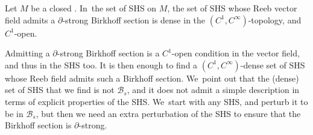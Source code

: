 \begin{theorem}\label{thm:C1generic}
Let $M$ be a closed \threemanifold. In~the set of SHS on $M$, the set of SHS whose Reeb vector field admits a $\partial$-strong Birkhoff section is dense in the $(C^1,C^\infty)$-topology, and $C^1$-open.
\end{theorem}

Admitting a $\partial$-strong Birkhoff section is a $C^1$-open condition in the vector field, and thus in the SHS too. It is then enough to find a $(C^1,C^\infty)$-dense set of SHS whose Reeb field admits such a Birkhoff section. We~point out that the (dense) set of SHS that we find is not $\mathcal{B}_s$, and it does not admit a simple description in terms of explicit properties of the SHS. We~start with any SHS, and perturb it to be in $\mathcal{B}_s$, but then we need an extra perturbation of the SHS to ensure that the Birkhoff section is $\partial$-strong.

